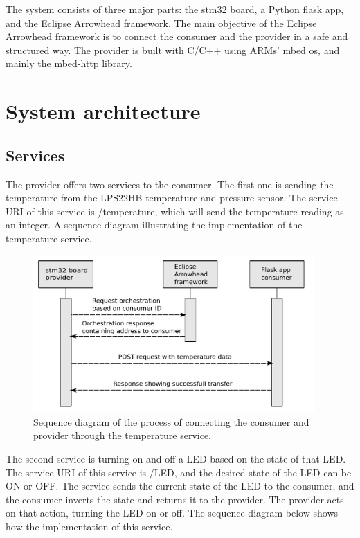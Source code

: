 The system consists of three major parts: the stm32 board, a Python flask app, and the Eclipse Arrowhead framework.
The main objective of the Eclipse Arrowhead framework is to connect the consumer and the provider in a safe and structured way.
The provider is built with C/C++ using ARMs' mbed os, and mainly the mbed-http library. 
\section{System architecture}
\subsection{Services}
The provider offers two services to the consumer. 
The first one is sending the temperature from the LPS22HB temperature and pressure sensor. 
The service URI of this service is /temperature, which will send the temperature reading as an integer.
A sequence diagram illustrating the implementation of the temperature service.
\begin{figure}[H]
    \centering
    \includegraphics[width=\textwidth, height=6cm]{Pictures/sequence_diagram_consumer.pdf} 
    \caption{Sequence diagram of the process of connecting the consumer and provider through the temperature service.}
    \label{sequence diagram consumer}
\end{figure}
The second service is turning on and off a LED based on the state of that LED.
The service URI of this service is /LED, and the desired state of the LED can be ON or OFF. 
The service sends the current state of the LED to the consumer, and the consumer inverts the state and returns it to the provider.
The provider acts on that action, turning the LED on or off. 
The sequence diagram below shows how the implementation of this service.

